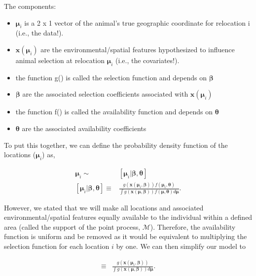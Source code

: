 \documentclass[12pt]{article}
\begin{document}
The components:

\begin{itemize}
\item $\boldsymbol{\mu}_{i}$ is a 2 x 1 vector of the animal's true geographic coordinate for relocation i (i.e., the data!).
\item $\textbf{x}(\boldsymbol{\mu}_{i})$ are the environmental/spatial features hypothesized to influence animal selection at relocation $\boldsymbol{\mu}_{i}$ (i.e., the covariates!).
\item the function g() is called the selection function and depends on $\boldsymbol{\beta} $
\item  $\boldsymbol{\beta}$ are the associated selection coefficients associated with $\textbf{x}(\boldsymbol{\mu}_{i})$
\item the function f() is called the availability function and depends on $\boldsymbol{\theta}$
\item  $\boldsymbol{\theta}$ are the associated availability coefficients 
\end{itemize}

To put this together, we can define the probability density function of the locations ($\boldsymbol{\mu}_{i}$) as,


\begin{align*}
\boldsymbol{\mu}_{i} \sim& [\boldsymbol{\mu}_{i}| \boldsymbol{\beta}, \boldsymbol{\theta}] \\
[\boldsymbol{\mu}_{i}| \boldsymbol{\beta}, \boldsymbol{\theta}] \equiv &  \frac{g(\textbf{x}(\boldsymbol{\mu}_{i}, \boldsymbol{\beta}))f(\boldsymbol{\mu}_{i},\boldsymbol{\theta})}{\int g(\textbf{x}(\boldsymbol{\mu}, \boldsymbol{\beta}))f(\boldsymbol{\mu},\boldsymbol{\theta})d\boldsymbol{\mu}}.
\end{align*}

However, we stated that we will make all locations and associated environmental/spatial features equally available to the individual within a defined area (called the support of the point process, $\mathcal{M}$). Therefore, the availability function is uniform and be removed as it would be equivalent to multiplying the selection function for each location $i$ by one. We can then simplify our model to


\begin{align*}
[\boldsymbol{\mu}_{i}| \boldsymbol{\beta}] \equiv &  \frac{g(\textbf{x}(\boldsymbol{\mu}_{i}, \boldsymbol{\beta}))}{\int g(\textbf{x}(\boldsymbol{\mu}, \boldsymbol{\beta}))d\boldsymbol{\mu}}.
\end{align*}
\end{document}
